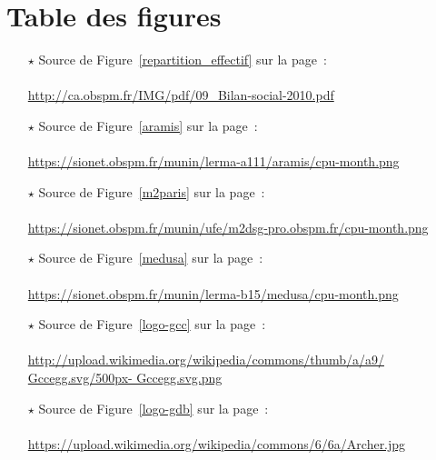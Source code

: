 \section*{Table des figures}


\begin{itemize}
	\item[$\star$]Source de Figure~\ref{repartition_effectif} sur la page~\pageref{repartition_effectif}:\\
	 				\\ %
	 				\url{http://ca.obspm.fr/IMG/pdf/09_Bilan-social-2010.pdf}
	\item[$\star$]Source de Figure~\ref{aramis} sur la page~\pageref{aramis}:\\
					\\ %
					\url{https://sionet.obspm.fr/munin/lerma-a111/aramis/cpu-month.png}
	\item[$\star$]Source de Figure~\ref{m2paris} sur la page~\pageref{m2paris}:\\
					\\ %
					\url{https://sionet.obspm.fr/munin/ufe/m2dsg-pro.obspm.fr/cpu-month.png}
	\item[$\star$]Source de Figure~\ref{medusa} sur la page~\pageref{medusa}:\\
					\\ %
					\url{https://sionet.obspm.fr/munin/lerma-b15/medusa/cpu-month.png}
	\item[$\star$]Source de Figure~\ref{logo-gcc} sur la page~\pageref{logo-gcc}:\\
					\\ %
					\url{http://upload.wikimedia.org/wikipedia/commons/thumb/a/a9/	Gccegg.svg/500px- Gccegg.svg.png}
	\item[$\star$]Source de Figure~\ref{logo-gdb} sur la page~\pageref{logo-gdb}:\\
					\\ %
					\url{https://upload.wikimedia.org/wikipedia/commons/6/6a/Archer.jpg}

\end{itemize}
